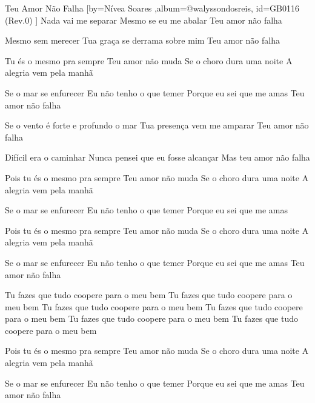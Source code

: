 \beginsong
{Teu Amor Não Falha %
}[by={Nívea Soares %
},album={@walyssondosreis},
id={GB0116 %
(Rev.0) %
}]
Nada vai me separar
Mesmo se eu me abalar
Teu amor não falha

Mesmo sem merecer
Tua graça se derrama sobre mim
Teu amor não falha

Tu és o mesmo pra sempre
Teu amor não muda
Se o choro dura uma noite
A alegria vem pela manhã

Se o mar se enfurecer
Eu não tenho o que temer
Porque eu sei que me amas
Teu amor não falha

Se o vento é forte e profundo o mar
Tua presença vem me amparar
Teu amor não falha

Difícil era o caminhar
Nunca pensei que eu fosse alcançar
Mas teu amor não falha

Pois tu és o mesmo pra sempre
Teu amor não muda
Se o choro dura uma noite
A alegria vem pela manhã

Se o mar se enfurecer
Eu não tenho o que temer
Porque eu sei que me amas

Pois tu és o mesmo pra sempre
Teu amor não muda
Se o choro dura uma noite
A alegria vem pela manhã

Se o mar se enfurecer
Eu não tenho o que temer
Porque eu sei que me amas
Teu amor não falha

Tu fazes que tudo coopere para o meu bem
Tu fazes que tudo coopere para o meu bem
Tu fazes que tudo coopere para o meu bem
Tu fazes que tudo coopere para o meu bem
Tu fazes que tudo coopere para o meu bem
Tu fazes que tudo coopere para o meu bem

Pois tu és o mesmo pra sempre
Teu amor não muda
Se o choro dura uma noite
A alegria vem pela manhã

Se o mar se enfurecer
Eu não tenho o que temer
Porque eu sei que me amas
Teu amor não falha


